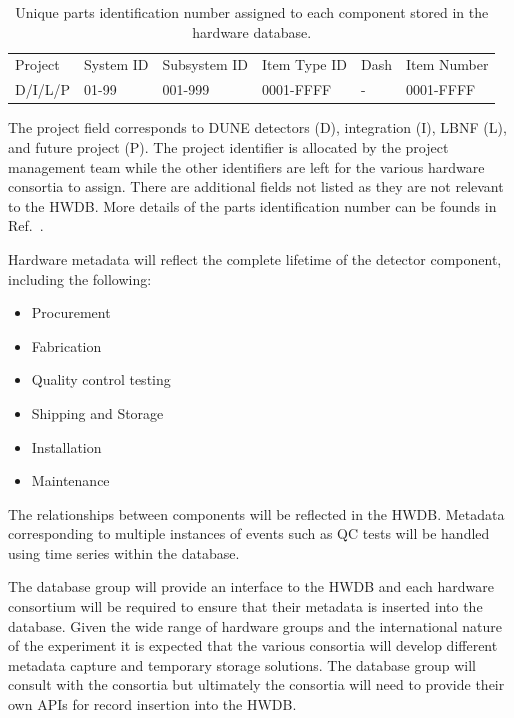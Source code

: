 \documentclass[../main-v1.tex]{subfiles}
\begin{document}
\begin{table}[h!]
\centering
 \begin{tabular}{l l l l l l} 
 
 Project & System ID & Subsystem ID & Item Type ID & Dash & Item Number  \\ [0.5ex] 
 
D/I/L/P & 01-99 & 001-999 & 0001-FFFF & - & 0001-FFFF \\  

\end{tabular}
\caption{Unique parts identification number assigned to each component stored in the hardware database.}
\label{table:partsid}
\end{table}

The project field corresponds to DUNE detectors (D), integration (I), LBNF (L), and future project (P). The project identifier is allocated by the project management team while the other identifiers are left for the various hardware consortia to assign. There are additional fields not listed as they are not relevant to the HWDB.  More details of the parts identification number can be founds in Ref.~\cite{bib:cernedms2505353}.

Hardware  metadata will reflect the complete lifetime of the detector component, including the following:

\begin{itemize}
\item Procurement 
\item Fabrication
\item Quality control testing
\item Shipping and Storage
\item Installation
\item Maintenance 
\end{itemize}

The relationships between components will be reflected in the HWDB. Metadata corresponding to multiple instances of events such as QC tests will be handled using time series within the database. 

The database group will provide an interface to the HWDB and each hardware consortium will be required to ensure that their metadata is inserted into the database. Given the wide range of hardware groups and the international nature of the experiment it is expected that the various consortia will develop different metadata capture and temporary storage solutions. The database group will consult with the consortia but ultimately the consortia will need to provide their own APIs for record insertion into the HWDB.  
\end{document}
